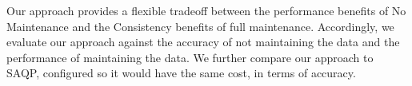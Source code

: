 \vspace{1em}

Our approach provides a flexible tradeoff between the performance benefits of No Maintenance and the Consistency benefits of full maintenance. Accordingly, we evaluate our approach against the accuracy of not maintaining the data and the performance of maintaining the data.
We further compare our approach to SAQP, configured so it would have the same cost, in terms of accuracy.
